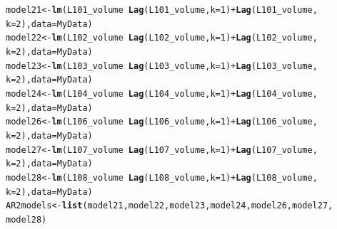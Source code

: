 \documentclass[review, authoryear]{elsarticle}\usepackage{graphicx, color}
\makeatletter
\newcommand{\hlfunctioncall}[1]{\textcolor[rgb]{0.501960784313725,0,0.329411764705882}{\textbf{#1}}}%
\newenvironment{kframe}{%
 \def\at@end@of@kframe{}%
 \ifinner\ifhmode%
  \def\at@end@of@kframe{\end{minipage}}%
  \begin{minipage}{\columnwidth}%
 \fi\fi%
 \def\FrameCommand##1{\hskip\@totalleftmargin \hskip-\fboxsep
 \colorbox{shadecolor}{##1}\hskip-\fboxsep
     \hskip-\linewidth \hskip-\@totalleftmargin \hskip\columnwidth}%
 \MakeFramed {\advance\hsize-\width
   \@totalleftmargin\z@ \linewidth\hsize
   \@setminipage}}%
 {\par\unskip\endMakeFramed%
 \at@end@of@kframe}
\newenvironment{knitrout}{}{} %
\makeatother
\begin{document}
\begin{knitrout}
\color{fgcolor}\begin{kframe}
\begin{alltt}
model21 <- \hlfunctioncall{lm}(L101_volume ~ \hlfunctioncall{Lag}(L101_volume, k = 1) + \hlfunctioncall{Lag}(L101_volume, 
    k = 2), data = MyData)
model22 <- \hlfunctioncall{lm}(L102_volume ~ \hlfunctioncall{Lag}(L102_volume, k = 1) + \hlfunctioncall{Lag}(L102_volume, 
    k = 2), data = MyData)
model23 <- \hlfunctioncall{lm}(L103_volume ~ \hlfunctioncall{Lag}(L103_volume, k = 1) + \hlfunctioncall{Lag}(L103_volume, 
    k = 2), data = MyData)
model24 <- \hlfunctioncall{lm}(L104_volume ~ \hlfunctioncall{Lag}(L104_volume, k = 1) + \hlfunctioncall{Lag}(L104_volume, 
    k = 2), data = MyData)
model26 <- \hlfunctioncall{lm}(L106_volume ~ \hlfunctioncall{Lag}(L106_volume, k = 1) + \hlfunctioncall{Lag}(L106_volume, 
    k = 2), data = MyData)
model27 <- \hlfunctioncall{lm}(L107_volume ~ \hlfunctioncall{Lag}(L107_volume, k = 1) + \hlfunctioncall{Lag}(L107_volume, 
    k = 2), data = MyData)
model28 <- \hlfunctioncall{lm}(L108_volume ~ \hlfunctioncall{Lag}(L108_volume, k = 1) + \hlfunctioncall{Lag}(L108_volume, 
    k = 2), data = MyData)
AR2models <- \hlfunctioncall{list}(model21, model22, model23, model24, model26, model27, 
    model28)
\end{alltt}
\end{kframe}
\end{knitrout}
\end{document}
